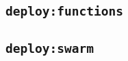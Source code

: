 \appendix
\appendixpage

\chapter{}

\section{\texttt{deploy:functions}}


\newpage
\section{\texttt{deploy:swarm}}

